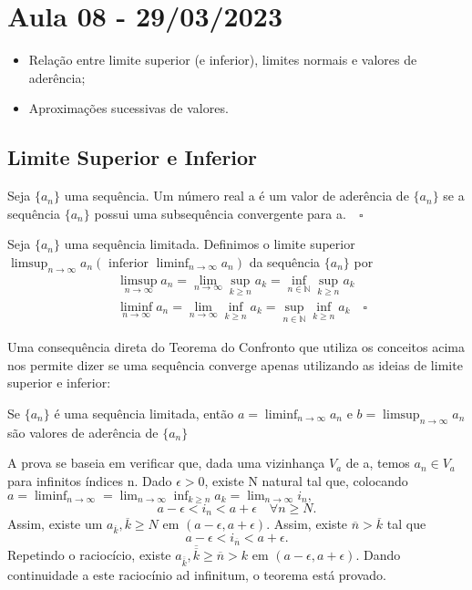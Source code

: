 \documentclass[analysis_notes.tex]{subfiles}
\begin{document}
\section{Aula 08 - 29/03/2023}
\begin{itemize}
	\item Rela\c c\~ao entre limite superior (e inferior), limites normais e valores de ader\^encia;
	\item Aproxima\c c\~oes sucessivas de valores.
\end{itemize}
\subsection{Limite Superior e Inferior}
\begin{def*}
	Seja $\{a_{n}\} $ uma sequ\^encia. Um n\'umero real a \'e um valor de ader\^encia de $\{a_{n}\} $ se a sequ\^encia $\{a_{n}\}$ possui
	uma subsequ\^encia convergente para a.$\quad\square$
\end{def*}
\begin{def*}
	Seja $\{a_{n}\} $  uma sequ\^encia limitada. Definimos o limite superior $\displaystyle\limsup_{n\to\infty}a_{n}(\text{ inferior }\liminf_{n\to\infty}a_{n})$ da
	sequ\^encia $\{a_{n}\} $ por
	\begin{align*}
		 & \limsup_{n\to\infty}a_{n} = \lim_{n\to\infty}\sup_{k\geq{n}}a_{k} = \inf_{n\in \mathbb{N}}\sup_{k\geq{n}}a_{k}             \\
		 & \liminf_{n\to\infty}a_{n} = \lim_{n\to\infty}\inf_{k\geq{n}}a_{k} = \sup_{n\in \mathbb{N}}\inf_{k\geq{n}}a_{k}\quad\square
	\end{align*}
\end{def*}
Uma consequ\^encia direta do Teorema do Confronto que utiliza os conceitos acima nos permite dizer se uma sequ\^encia converge apenas
utilizando as ideias de limite superior e inferior:
\begin{theorem*}
	Se $\{a_{n}\} $ \'e uma sequ\^encia limitada, ent\~ao $a = \liminf_{n\to\infty}a_{n}$ e $b = \limsup_{n\to\infty}a_{n}$
	s\~ao valores de ader\^encia de $\{a_{n}\} $
\end{theorem*}
\begin{proof*}
	A prova se baseia em verificar que, dada uma vizinhan\c ca $V_{a}$ de a, temos $a_{n}\in V_{a}$ para infinitos \'indices n.
	Dado $\epsilon > 0$, existe N natural tal que, colocando $a =\displaystyle \liminf_{n\to\infty} = \lim_{n\to\infty}\inf_{k\geq{n}}a_{k} = \lim_{n\to\infty}i_{n},$
	$$
		a - \epsilon < i_{n} < a + \epsilon \quad \forall n \geq{N}.
	$$
	Assim, existe um $a_{\overline{k}}, \overline{k}\geq{N}$ em $(a-\epsilon, a+\epsilon).$ Assim, existe $\overline{n} > \overline{k}$ tal que
	$$
		a - \epsilon < i_{\overline{n}} < a + \epsilon.
	$$
	Repetindo o racioc\'icio, existe $a_{\overline{\overline{k}}}, \overline{\overline{k}} \geq{\overline{n}} > k$ em $(a - \epsilon, a + \epsilon).$
	Dando continuidade a este racioc\'inio ad infinitum, o teorema est\'a provado. \qedsymbol
\end{proof*}
\end{document}
